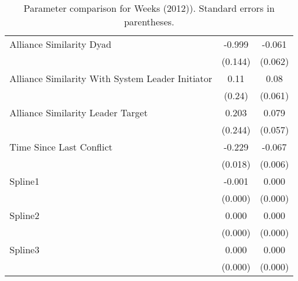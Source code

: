 \begin{table}[ht]
\begin{tabular}{lcc}
  Alliance Similarity Dyad  & -0.999 & -0.061 \\ 
   & (0.144) & (0.062) \\ 
  Alliance Similarity With System Leader Initiator & 0.11 & 0.08 \\ 
   & (0.24) & (0.061) \\ 
  Alliance Similarity Leader Target & 0.203 & 0.079 \\ 
   & (0.244) & (0.057) \\ 
  Time Since Last Conflict & -0.229 & -0.067 \\ 
   & (0.018) & (0.006) \\ 
  Spline1 & -0.001 & 0.000 \\ 
   & (0.000) & (0.000) \\ 
  Spline2 & 0.000 & 0.000 \\ 
   & (0.000) & (0.000) \\ 
  Spline3 & 0.000 & 0.000 \\ 
   & (0.000) & (0.000) \\ 
   \hline
\hline
\end{tabular}
\endgroup
\caption{Parameter comparison for Weeks (2012)). Standard errors in parentheses.} 
\label{tab:appendix_tableB2_coef}
\end{table}

